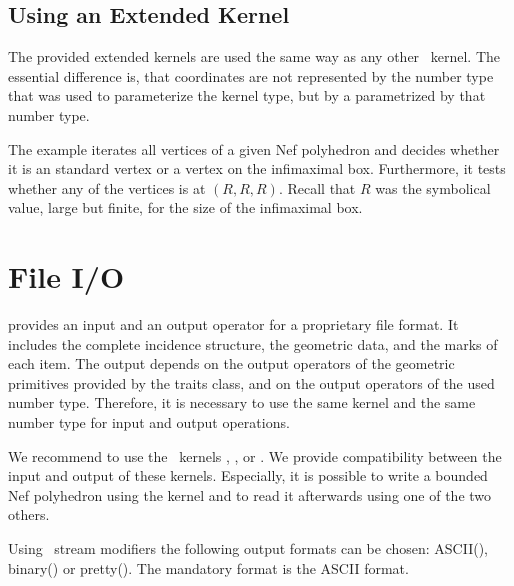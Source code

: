 \subsection{Using an Extended Kernel}

The provided extended kernels are used the same way as any other
\cgal\ kernel.  The essential difference is, that coordinates are not
represented by the number type that was used to parameterize the
kernel type, but by a  parametrized by that number
type.

The example iterates all vertices of a given Nef polyhedron and decides whether
it is an standard vertex or a vertex on the infimaximal box. Furthermore, it 
tests whether any of the vertices is at $(R,R,R)$. Recall that $R$ was
the symbolical value, large but finite, for the size of the infimaximal box. 


\section{File I/O}
\label{sectionNef_3IO}

 provides an input and an output operator for a
proprietary file format. It includes the complete incidence structure,
the geometric data, and the marks of each item.  The output depends on
the output operators of the geometric primitives provided by the
traits class, and on the output operators of the used number type.
Therefore, it is necessary to use the same kernel and the same number
type for input and output operations.

We recommend to use the \cgal\ kernels ,
, or . We provide
compatibility between the input and output of these kernels.
Especially, it is possible to write a bounded Nef polyhedron using the
 kernel and to read it afterwards using one
of the two others.

Using \cgal\ stream modifiers the following output formats can be chosen: 
ASCII(), binary() or 
pretty(). The mandatory format is the ASCII format.

